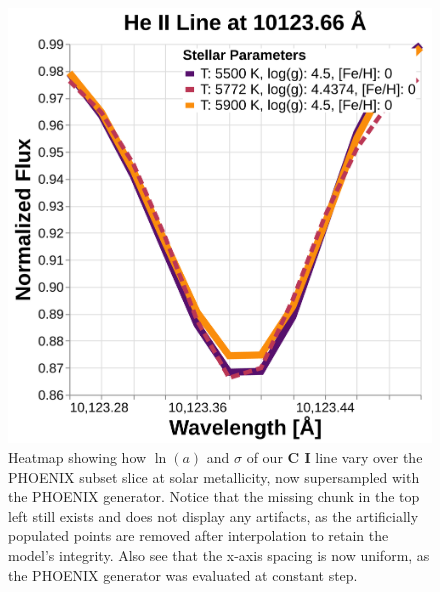 \documentclass[twocolumn, linenumbers]{aastex631}
\begin{document}
\begin{figure}
    \centering
    \includegraphics[width=\textwidth]{figure5}
    \caption{Heatmap showing how $\ln(a)$ and $\sigma$ of our \textbf{C I} line vary over the PHOENIX subset slice at solar metallicity, now supersampled with the PHOENIX generator.
    Notice that the missing chunk in the top left still exists and does not display any artifacts, as the artificially populated points are removed after interpolation to retain the model's integrity.
    Also see that the x-axis spacing is now uniform, as the PHOENIX generator was evaluated at constant step.}
    \label{fig:figure5}
\end{figure}
\end{document}
